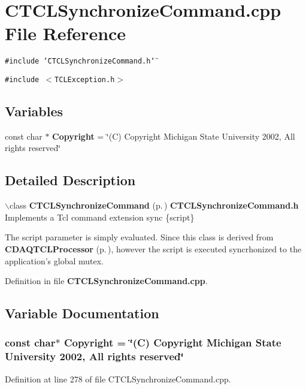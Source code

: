 \section{CTCLSynchronize\-Command.cpp File Reference}
\label{CTCLSynchronizeCommand_8cpp}
{\tt \#include \char`\"{}CTCLSynchronize\-Command.h\char`\"{}}\par
{\tt \#include $<$TCLException.h$>$}\par
\subsection*{Variables}
\begin{CompactItemize}
\item 
const char $\ast$ {\bf Copyright} = \char`\"{}(C) Copyright Michigan State University 2002, All rights reserved\char`\"{}
\end{CompactItemize}


\subsection{Detailed Description}


$\backslash$class {\bf CTCLSynchronize\-Command} {\rm (p.\,\pageref{classCTCLSynchronizeCommand})} {\bf CTCLSynchronize\-Command.h} Implements a Tcl command extension sync \{script\}

The script parameter is simply evaluated. Since this class is derived from {\bf CDAQTCLProcessor} {\rm (p.\,\pageref{classCDAQTCLProcessor})}, however the script is executed syncrhonized to the application's global mutex.



Definition in file {\bf CTCLSynchronize\-Command.cpp}.

\subsection{Variable Documentation}
\subsubsection{\setlength{\rightskip}{0pt plus 5cm}const char$\ast$ Copyright = \char`\"{}(C) Copyright Michigan State University 2002, All rights reserved\char`\"{}\hspace{0.3cm}{\tt  [static]}}\label{CTCLSynchronizeCommand_8cpp_a0}




Definition at line 278 of file CTCLSynchronize\-Command.cpp.